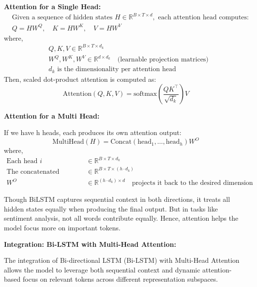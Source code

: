 \documentclass{article}
\begin{document}
\textbf{Attention for a Single Head:}
\[
\begin{aligned}
&\text{Given a sequence of hidden states } H \in \mathbb{R}^{B \times T \times d}, \text{ each attention head computes:} \\
&Q = H W^Q, \quad K = H W^K, \quad V = H W^V
\end{aligned}
\]
where,
\[
\begin{aligned}
&Q, K, V \in \mathbb{R}^{B \times T \times d_k} \\
&W^Q, W^K, W^V \in \mathbb{R}^{d \times d_k} \quad \text{(learnable projection matrices)} \\
&d_k \text{ is the dimensionality per attention head}
\end{aligned}
\]
Then, scaled dot-product attention is computed as:
\[
\text{Attention}(Q, K, V) = \text{softmax}\left( \frac{QK^\top}{\sqrt{d_k}} \right) V
\]

\textbf{Attention for a Multi Head:}

If we have h heads, each produces its own attention output:
\[
\text{MultiHead}(H) = \text{Concat}(\text{head}_1, \dots, \text{head}_h)W^O
\]
where,
\[
\begin{aligned}
\text{Each head } i &\in \mathbb{R}^{B \times T \times d_k} \\
\text{The concatenated output } &\in \mathbb{R}^{B \times T \times (h \cdot d_k)} \\
W^O &\in \mathbb{R}^{(h \cdot d_k) \times d} \quad \text{projects it back to the desired dimension}
\end{aligned}
\]

Though BiLSTM captures sequential context in both directions, it treats all hidden states equally when producing the final output. But in tasks like sentiment analysis, not all words contribute equally. Hence, attention helps the model focus more on important tokens.

\textbf{Integration: Bi-LSTM with Multi-Head Attention:}

The integration of Bi-directional LSTM (Bi-LSTM) with Multi-Head Attention allows the model to leverage both sequential context and dynamic attention-based focus on relevant tokens across different representation subspaces.
\end{document}
